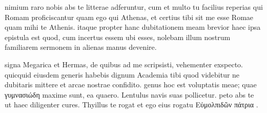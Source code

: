 


 nimium raro nobis abs te litterae adferuntur, cum et multo tu facilius reperias qui Romam proficiscantur quam ego qui Athenas, et certius tibi sit me esse Romae quam mihi te Athenis. itaque propter hanc dubitationem meam brevior haec ipsa epistula est quod, cum incertus essem ubi esses, nolebam illum nostrum familiarem sermonem in alienas manus devenire.

 signa Megarica et Hermas, de quibus ad me scripsisti, vehementer exspecto. quicquid eiusdem generis habebis dignum Academia tibi quod videbitur ne dubitaris mittere et arcae nostrae confidito. genus hoc est voluptatis meae; quae γυμνασιώδη maxime sunt, ea quaero. Lentulus navis suas pollicetur. peto abs te ut haec diligenter cures. Thyillus te rogat et ego eius rogatu Εὐμολπιδῶν πάτρια .
